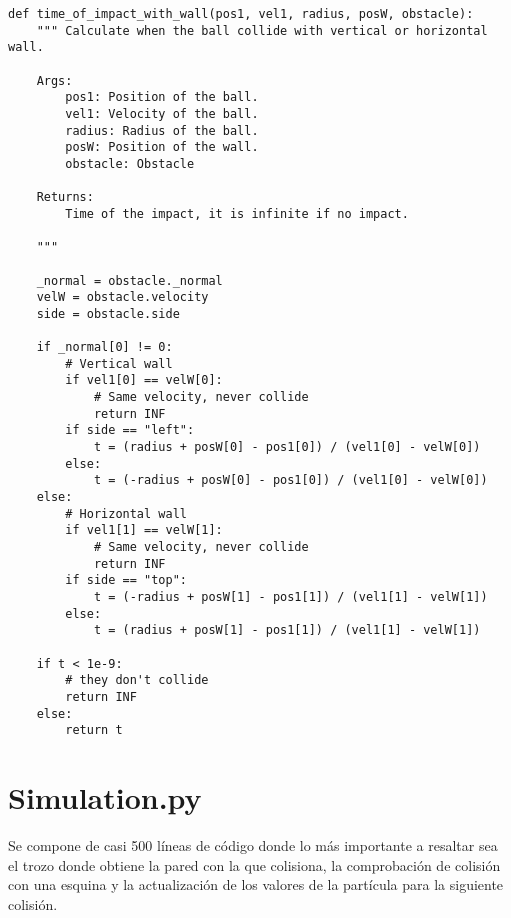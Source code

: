 \begin{lstlisting}[breaklines]
def time_of_impact_with_wall(pos1, vel1, radius, posW, obstacle):
    """ Calculate when the ball collide with vertical or horizontal wall.

    Args:
        pos1: Position of the ball.
        vel1: Velocity of the ball.
        radius: Radius of the ball.
        posW: Position of the wall.
        obstacle: Obstacle

    Returns:
        Time of the impact, it is infinite if no impact.

    """

    _normal = obstacle._normal
    velW = obstacle.velocity
    side = obstacle.side

    if _normal[0] != 0:
        # Vertical wall
        if vel1[0] == velW[0]:
            # Same velocity, never collide
            return INF
        if side == "left":
            t = (radius + posW[0] - pos1[0]) / (vel1[0] - velW[0])
        else:
            t = (-radius + posW[0] - pos1[0]) / (vel1[0] - velW[0])
    else:
        # Horizontal wall
        if vel1[1] == velW[1]:
            # Same velocity, never collide
            return INF
        if side == "top":
            t = (-radius + posW[1] - pos1[1]) / (vel1[1] - velW[1])
        else:
            t = (radius + posW[1] - pos1[1]) / (vel1[1] - velW[1])

    if t < 1e-9:
        # they don't collide
        return INF
    else:
        return t
\end{lstlisting}

\section*{Simulation.py}

Se compone de casi 500 líneas de código donde lo más importante a resaltar sea el trozo donde obtiene la pared con la que colisiona, la comprobación de colisión con una esquina y la actualización de los valores de la partícula para la siguiente colisión.

